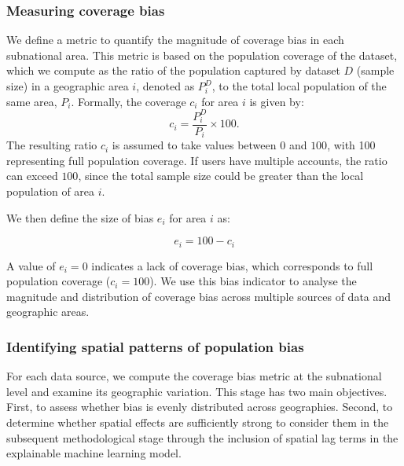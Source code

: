 \documentclass[]{rsos}%
\begin{document}
\subsubsection{Measuring coverage bias}\label{measuring-coverage-bias}

We define a metric to quantify the magnitude of coverage bias in each
subnational area. This metric is based on the population coverage of the
dataset, which we compute as the ratio of the population captured by
dataset \(D\) (sample size) in a geographic area \(i\), denoted as \(P_i^D\),
to the total local population of the same area, \(P_i\). Formally, the
coverage \(c_i\) for area \(i\) is given by: \begin{equation}
c_i = \dfrac{P_i^D}{P_i} \times 100.
\end{equation} The resulting ratio \(c_i\) is assumed to take values
between \(0\) and \(100\), with 100 representing full population coverage.
If users have multiple accounts, the ratio can exceed \(100\), since the
total sample size could be greater than the local population of area
\(i\).

We then define the size of bias \(e_i\) for area \(i\) as:

\begin{equation} \label{eq:size-bias}
e_i = 100 - c_i
\end{equation}

A value of \(e_i = 0\) indicates a lack of coverage bias, which
corresponds to full population coverage (\(c_i = 100\)). We use this bias
indicator to analyse the magnitude and distribution of coverage bias
across multiple sources of data and geographic areas.

\subsubsection{Identifying spatial patterns of population bias}\label{identifying-spatial-patterns-of-population-bias}

For each data source, we compute the coverage bias metric at the
subnational level and examine its geographic variation. This stage has
two main objectives. First, to assess whether bias is evenly distributed
across geographies. Second, to determine whether spatial effects are
sufficiently strong to consider them in the subsequent methodological
stage through the inclusion of spatial lag terms in the explainable
machine learning model.
\end{document}

